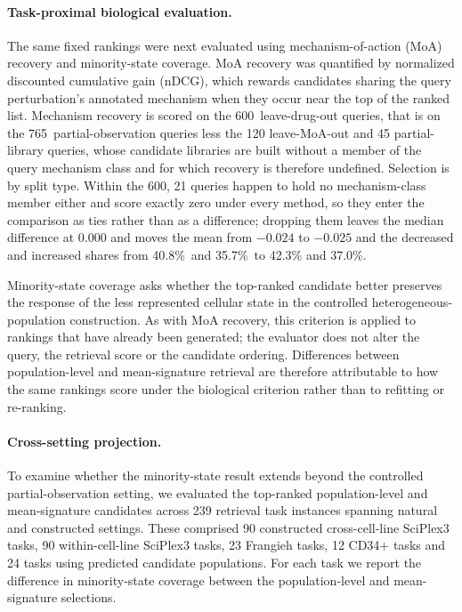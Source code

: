 \documentclass[11pt,letterpaper]{article}
\newcommand{\NALL}{765}                 %
\newcommand{\NMOA}{600}                 %
\newcommand{\CLASSBMEAN}{-0.024}        %
\newcommand{\CLASSBWORSE}{40.8\%}       %
\newcommand{\CLASSBBETTER}{35.7\%}      %
\begin{document}
\paragraph{Task-proximal biological evaluation.}
The same fixed rankings were next evaluated using mechanism-of-action (MoA) recovery and
minority-state coverage. MoA recovery was quantified by normalized discounted cumulative gain
(nDCG)\cite{nDCG}, which rewards candidates sharing the query perturbation's annotated mechanism
when they occur near the top of the ranked list. Mechanism recovery is scored on the \NMOA\ leave-drug-out queries, that is on the
\NALL\ partial-observation queries less the 120 leave-MoA-out and 45 partial-library queries,
whose candidate libraries are built without a member of the query mechanism class and for which
recovery is therefore undefined. Selection is by split type. Within the \NMOA, 21 queries happen
to hold no mechanism-class member either and score exactly zero under every method, so they enter
the comparison as ties rather than as a difference; dropping them leaves the median difference at
0.000 and moves the mean from $\CLASSBMEAN$ to $-0.025$ and the decreased and increased shares
from \CLASSBWORSE\ and \CLASSBBETTER\ to 42.3\% and 37.0\%.

Minority-state coverage asks whether the top-ranked candidate better preserves the response of the
less represented cellular state in the controlled heterogeneous-population construction. As with
MoA recovery, this criterion is applied to rankings that have already been generated; the evaluator
does not alter the query, the retrieval score or the candidate ordering. Differences between
population-level and mean-signature retrieval are therefore attributable to how the same rankings
score under the biological criterion rather than to refitting or re-ranking.

\paragraph{Cross-setting projection.}
To examine whether the minority-state result extends beyond the controlled partial-observation
setting, we evaluated the top-ranked population-level and mean-signature candidates across 239
retrieval task instances spanning natural and constructed settings. These comprised 90 constructed
cross-cell-line SciPlex3 tasks, 90 within-cell-line SciPlex3 tasks, 23 Frangieh tasks, 12
CD34$+$ tasks and 24 tasks using predicted candidate populations. For each task we report the difference in minority-state coverage between the
population-level and mean-signature selections.
\end{document}
